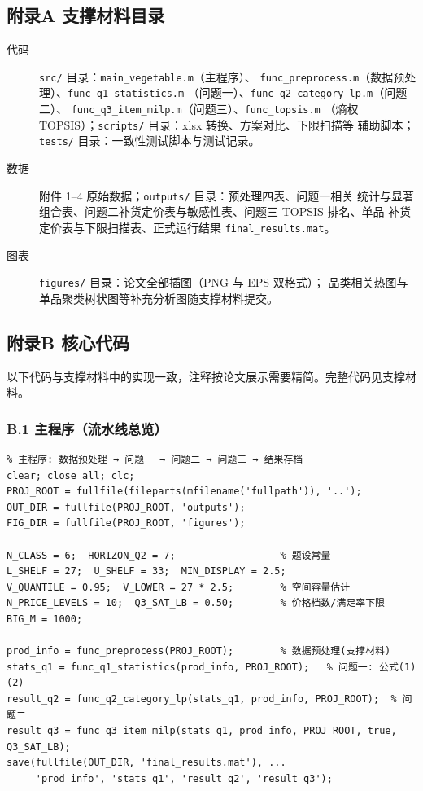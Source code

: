 
\subsection*{附录A 支撑材料目录}

\begin{description}
\item[代码] \texttt{src/} 目录：\texttt{main\_vegetable.m}（主程序）、
      \texttt{func\_preprocess.m}（数据预处理）、\texttt{func\_q1\_statistics.m}
      （问题一）、\texttt{func\_q2\_category\_lp.m}（问题二）、
      \texttt{func\_q3\_item\_milp.m}（问题三）、\texttt{func\_topsis.m}
      （熵权 TOPSIS）；\texttt{scripts/} 目录：xlsx 转换、方案对比、下限扫描等
      辅助脚本；\texttt{tests/} 目录：一致性测试脚本与测试记录。
\item[数据] 附件 1--4 原始数据；\texttt{outputs/} 目录：预处理四表、问题一相关
      统计与显著组合表、问题二补货定价表与敏感性表、问题三 TOPSIS 排名、单品
      补货定价表与下限扫描表、正式运行结果 \texttt{final\_results.mat}。
\item[图表] \texttt{figures/} 目录：论文全部插图（PNG 与 EPS 双格式）；
      品类相关热图与单品聚类树状图等补充分析图随支撑材料提交。
\end{description}

\subsection*{附录B 核心代码}

以下代码与支撑材料中的实现一致，注释按论文展示需要精简。完整代码见支撑材料。

\subsubsection*{B.1 主程序（流水线总览）}

\begin{lstlisting}
% 主程序: 数据预处理 → 问题一 → 问题二 → 问题三 → 结果存档
clear; close all; clc;
PROJ_ROOT = fullfile(fileparts(mfilename('fullpath')), '..');
OUT_DIR = fullfile(PROJ_ROOT, 'outputs');
FIG_DIR = fullfile(PROJ_ROOT, 'figures');

N_CLASS = 6;  HORIZON_Q2 = 7;                  % 题设常量
L_SHELF = 27;  U_SHELF = 33;  MIN_DISPLAY = 2.5;
V_QUANTILE = 0.95;  V_LOWER = 27 * 2.5;        % 空间容量估计
N_PRICE_LEVELS = 10;  Q3_SAT_LB = 0.50;        % 价格档数/满足率下限
BIG_M = 1000;

prod_info = func_preprocess(PROJ_ROOT);        % 数据预处理(支撑材料)
stats_q1 = func_q1_statistics(prod_info, PROJ_ROOT);   % 问题一: 公式(1)(2)
result_q2 = func_q2_category_lp(stats_q1, prod_info, PROJ_ROOT);  % 问题二
result_q3 = func_q3_item_milp(stats_q1, prod_info, PROJ_ROOT, true, Q3_SAT_LB);
save(fullfile(OUT_DIR, 'final_results.mat'), ...
     'prod_info', 'stats_q1', 'result_q2', 'result_q3');
\end{lstlisting}

